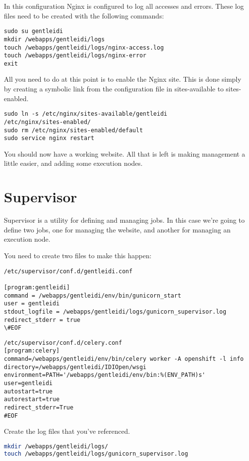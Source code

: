 In this configuration Nginx is configured to log all accesses and errors. These
log files need to be created with the following commands:

\begin{verbatim}
sudo su gentleidi
mkdir /webapps/gentleidi/logs
touch /webapps/gentleidi/logs/nginx-access.log
touch /webapps/gentleidi/logs/nginx-error
exit
\end{verbatim}

All you need to do at this point is to enable the Nginx site. This is
done simply by creating a symbolic link from the configuration file in
sites-available to sites-enabled.

\begin{verbatim}
sudo ln -s /etc/nginx/sites-available/gentleidi
/etc/nginx/sites-enabled/
sudo rm /etc/nginx/sites-enabled/default
sudo service nginx restart
\end{verbatim}

You should now have a working website. All that is left
is making management a little easier, and adding some execution nodes.

\section{Supervisor}
Supervisor is a utility for defining and managing jobs. In this case
we're going to define two jobs, one for managing the
website, and another for managing an execution node.

You need to create two files to make this happen:

\begin{verbatim}
/etc/supervisor/conf.d/gentleidi.conf

[program:gentleidi]
command = /webapps/gentleidi/env/bin/gunicorn_start
user = gentleidi
stdout_logfile = /webapps/gentleidi/logs/gunicorn_supervisor.log
redirect_stderr = true
\#EOF
\end{verbatim}

\begin{verbatim}
/etc/supervisor/conf.d/celery.conf
[program:celery]
command=/webapps/gentleidi/env/bin/celery worker -A openshift -l info
directory=/webapps/gentleidi/IDIOpen/wsgi
environment=PATH='/webapps/gentleidi/env/bin:%(ENV_PATH)s'
user=gentleidi
autostart=true
autorestart=true
redirect_stderr=True
#EOF
\end{verbatim}

Create the log files that you've referenced.
\begin{lstlisting}[language=bash]
mkdir /webapps/gentleidi/logs/
touch /webapps/gentleidi/logs/gunicorn_supervisor.log
\end{lstlisting}


